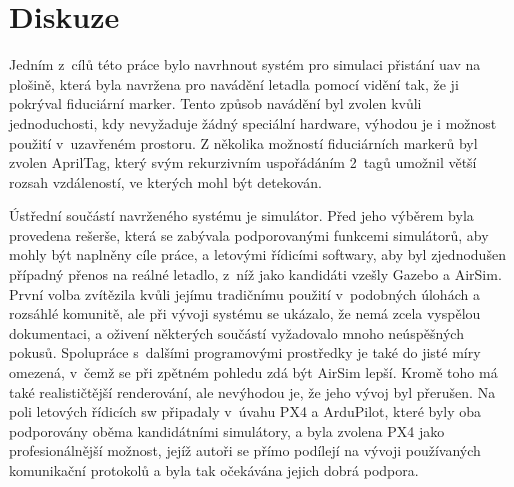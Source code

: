 \chapter{Diskuze} \label{chap:discussion}



Jedním z~cílů této práce bylo navrhnout systém pro simulaci přistání \acrshort{uav} na plošině, která byla navržena pro navádění letadla pomocí vidění tak, že ji pokrýval fiduciární marker. Tento způsob navádění byl zvolen kvůli jednoduchosti, kdy nevyžaduje žádný speciální hardware, výhodou je i možnost použití v~uzavřeném prostoru. Z několika možností fiduciárních markerů byl zvolen AprilTag, který svým rekurzivním uspořádáním 2~tagů umožnil větší rozsah vzdáleností, ve kterých mohl být detekován.

Ústřední součástí navrženého systému je simulátor. Před jeho výběrem byla provedena rešerše, která se zabývala podporovanými funkcemi simulátorů, aby mohly být naplněny cíle práce, a letovými řídicími softwary, aby byl zjednodušen případný přenos na reálné letadlo, z~níž jako kandidáti vzešly Gazebo a AirSim. První volba zvítězila kvůli jejímu tradičnímu použití v~podobných úlohách a rozsáhlé komunitě, ale při vývoji systému se ukázalo, že nemá zcela vyspělou dokumentaci, a oživení některých součástí vyžadovalo mnoho neúspěšných pokusů. Spolupráce s~dalšími programovými prostředky je také do jisté míry omezená, v~čemž se při zpětném pohledu zdá být AirSim lepší. Kromě toho má také realističtější renderování, ale nevýhodou je, že jeho vývoj byl přerušen. Na poli letových řídicích \acrshort{sw} připadaly v~úvahu PX4 a ArduPilot, které byly oba podporovány oběma kandidátními simulátory, a byla zvolena PX4 jako profesionálnější možnost, jejíž autoři se přímo podílejí na vývoji používaných komunikační protokolů a byla tak očekávána jejich dobrá podpora.

